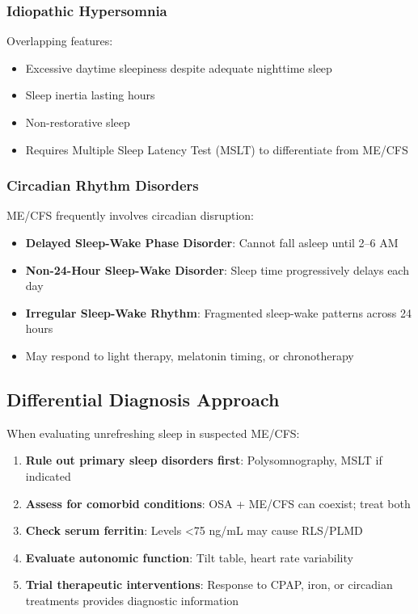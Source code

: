 \subsubsection{Idiopathic Hypersomnia}

Overlapping features:
\begin{itemize}
    \item Excessive daytime sleepiness despite adequate nighttime sleep
    \item Sleep inertia lasting hours
    \item Non-restorative sleep
    \item Requires Multiple Sleep Latency Test (MSLT) to differentiate from ME/CFS
\end{itemize}

\subsubsection{Circadian Rhythm Disorders}

ME/CFS frequently involves circadian disruption:
\begin{itemize}
    \item \textbf{Delayed Sleep-Wake Phase Disorder}: Cannot fall asleep until 2--6 AM
    \item \textbf{Non-24-Hour Sleep-Wake Disorder}: Sleep time progressively delays each day
    \item \textbf{Irregular Sleep-Wake Rhythm}: Fragmented sleep-wake patterns across 24 hours
    \item May respond to light therapy, melatonin timing, or chronotherapy
\end{itemize}

\subsection{Differential Diagnosis Approach}

When evaluating unrefreshing sleep in suspected ME/CFS:

\begin{enumerate}
    \item \textbf{Rule out primary sleep disorders first}: Polysomnography, MSLT if indicated
    \item \textbf{Assess for comorbid conditions}: OSA + ME/CFS can coexist; treat both
    \item \textbf{Check serum ferritin}: Levels <75 ng/mL may cause RLS/PLMD
    \item \textbf{Evaluate autonomic function}: Tilt table, heart rate variability
    \item \textbf{Trial therapeutic interventions}: Response to CPAP, iron, or circadian treatments provides diagnostic information
\end{enumerate}

